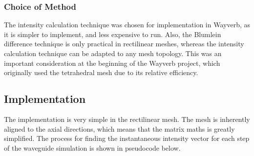 \documentclass[]{scrreprt}
\begin{document}
\subsubsection{Choice of Method}\label{choice-of-method}

The intensity calculation technique was chosen for implementation in
Wayverb, as it is simpler to implement, and less expensive to run. Also,
the Blumlein difference technique is only practical in rectilinear
meshes, whereas the intensity calculation technique can be adapted to
any mesh topology. This was an important consideration at the beginning
of the Wayverb project, which originally used the tetrahedral mesh due
to its relative efficiency.

\hypertarget{implementation-3}{\subsection{Implementation}\label{implementation-3}}

The implementation is very simple in the rectilinear mesh. The mesh is
inherently aligned to the axial directions, which means that the matrix
maths is greatly simplified. The process for finding the instantaneous
intensity vector for each step of the waveguide simulation is shown in
pseudocode below.
\end{document}
